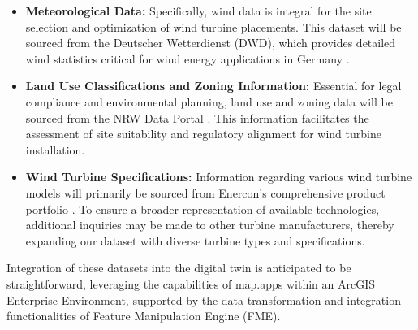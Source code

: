 \documentclass[11pt, titlepage, a4paper]{scrartcl}
\begin{document}
\begin{linenumbers}
\begin{itemize}
        \item \textbf{Meteorological Data:} Specifically, wind data is integral for the site selection and optimization of wind turbine placements. This dataset will be sourced from the Deutscher Wetterdienst (DWD), which provides detailed wind statistics critical for wind energy applications in Germany \cite{deutscherwetterdienstWinddatenFurWindenergienutzer}.

        \item \textbf{Land Use Classifications and Zoning Information:} Essential for legal compliance and environmental planning, land use and zoning data will be sourced from the NRW Data Portal \cite{freistaatsachsenOpenDataPortal}. This information facilitates the assessment of site suitability and regulatory alignment for wind turbine installation.

        \item \textbf{Wind Turbine Specifications:} Information regarding various wind turbine models will primarily be sourced from Enercon’s comprehensive product portfolio \cite{enerconglobalgmbhENERCONWindenergieanlagenPortfolio}. To ensure a broader representation of available technologies, additional inquiries may be made to other turbine manufacturers, thereby expanding our dataset with diverse turbine types and specifications.
    \end{itemize}

    Integration of these datasets into the digital twin is anticipated to be straightforward, leveraging the capabilities of map.apps within an ArcGIS Enterprise Environment, supported by the data transformation and integration functionalities of Feature Manipulation Engine (FME).





\end{linenumbers}
\end{document}
